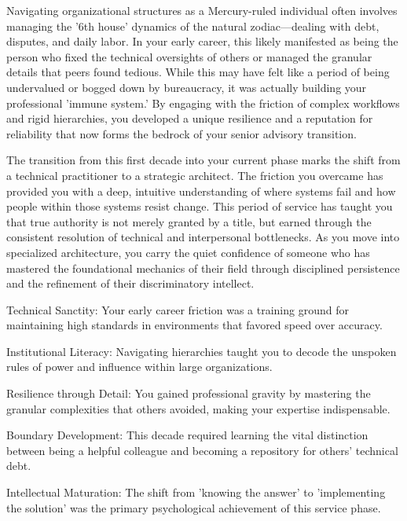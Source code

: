 {\fontsize{9}{13}\selectfont Navigating organizational structures as a Mercury-ruled individual often involves managing the '6th house' dynamics of the natural zodiac---dealing with debt, disputes, and daily labor. In your early career, this likely manifested as being the person who fixed the technical oversights of others or managed the granular details that peers found tedious. While this may have felt like a period of being undervalued or bogged down by bureaucracy, it was actually building your professional 'immune system.' By engaging with the friction of complex workflows and rigid hierarchies, you developed a unique resilience and a reputation for reliability that now forms the bedrock of your senior advisory transition.}\par\vspace{1.8mm}

{\fontsize{9}{13}\selectfont The transition from this first decade into your current phase marks the shift from a technical practitioner to a strategic architect. The friction you overcame has provided you with a deep, intuitive understanding of where systems fail and how people within those systems resist change. This period of service has taught you that true authority is not merely granted by a title, but earned through the consistent resolution of technical and interpersonal bottlenecks. As you move into specialized architecture, you carry the quiet confidence of someone who has mastered the foundational mechanics of their field through disciplined persistence and the refinement of their discriminatory intellect.}\par\vspace{1.8mm}

\begin{diamondlist}
  \item {\fontsize{8.5}{12}\selectfont Technical Sanctity: Your early career friction was a training ground for maintaining high standards in environments that favored speed over accuracy.}
  \item {\fontsize{8.5}{12}\selectfont Institutional Literacy: Navigating hierarchies taught you to decode the unspoken rules of power and influence within large organizations.}
  \item {\fontsize{8.5}{12}\selectfont Resilience through Detail: You gained professional gravity by mastering the granular complexities that others avoided, making your expertise indispensable.}
  \item {\fontsize{8.5}{12}\selectfont Boundary Development: This decade required learning the vital distinction between being a helpful colleague and becoming a repository for others' technical debt.}
  \item {\fontsize{8.5}{12}\selectfont Intellectual Maturation: The shift from 'knowing the answer' to 'implementing the solution' was the primary psychological achievement of this service phase.}
\end{diamondlist}

